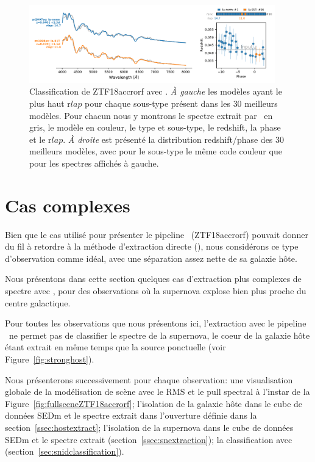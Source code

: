 \documentclass[../main/main.tex]{subfiles}
\begin{document}
\begin{figure}[ht]
  \centering
  \includegraphics[width=0.95\textwidth]{../figures/07_scene/ZTF18accrorf_snid_typing.pdf}
  \caption[Classification de ZTF18accrorf avec
  ]{Classification de ZTF18accrorf avec . \emph{À
      gauche} les modèles ayant le plus haut r$lap$ pour chaque
    sous-type présent dans les $30$ meilleurs modèles. Pour chacun nous
    y montrons le spectre extrait par \hypergal\ en gris, le modèle en couleur, le type et sous-type, le redshift, la phase et
  le r$lap$. \emph{À droite} est présenté la distribution
  redshift/phase des $30$ meilleurs modèles, avec pour le
  sous-type le même code couleur que pour les spectres affichés à gauche.}
  \label{fig:snidZTF18accrorf}
\end{figure}


\section{Cas complexes}

Bien que le cas utilisé pour présenter le pipeline \hypergal\
(ZTF18accrorf) pouvait donner du
fil à retordre à la méthode d'extraction directe (\pysedm), nous
considérons ce type d'observation comme idéal, avec une séparation assez
nette de sa galaxie hôte.

Nous présentons dans cette section quelques cas d'extraction plus
complexes de spectre avec \hypergal, pour des observations où la supernova explose
bien plus proche du centre galactique.

Pour toutes les observations que nous présentons ici, l'extraction avec le pipeline
\pysedm\ ne permet pas de classifier le spectre de la supernova, le coeur de
la galaxie hôte étant extrait en même temps que la source ponctuelle
(voir Figure~\ref{fig:stronghost}).

Nous présenterons successivement pour chaque observation: une visualisation globale de la
modélisation de scène avec le RMS et le pull spectral
à l'instar de la Figure~\ref{fig:fullsceneZTF18accrorf}; l'isolation de
la galaxie hôte dans le cube de données SEDm
et le spectre extrait dans l'ouverture définie dans la section~\ref{ssec:hostextract};
l'isolation de la supernova dans le cube de données SEDm et le spectre
extrait (section~\ref{ssec:snextraction}); la
classification avec  (section~\ref{sec:snidclassification}). 
\end{document}
